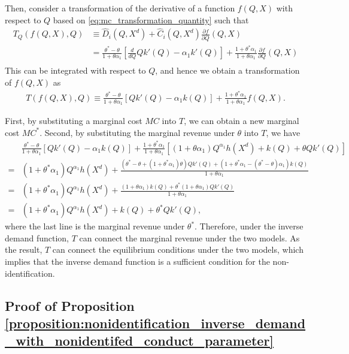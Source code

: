 \documentclass[11pt, a4paper]{article}
\theoremstyle{remark}
\begin{document}
Then, consider a transformation of the derivative of a function $f(Q, X)$ with respect to $Q$ based on \eqref{eq:mc_transformation_quantity} such that
\begin{align}
    T_Q\left(f(Q,X), Q\right) & \equiv \hat{D}_i(Q, X^{d}) + \hat{C}_i(Q, X^{d}) \frac{\partial f}{\partial Q}(Q, X)\\
    & = \frac{\theta^{*} - \theta}{1 + \theta\alpha_1} \left[\frac{d}{dQ}Qk'(Q)  -\alpha_1k'(Q) \right] + \frac{1 + \theta^{*}\alpha_1}{1 + \theta\alpha_1} \frac{\partial f}{\partial Q}(Q, X)\\
\end{align}
This can be integrated with respect to $Q$, and hence we obtain a transformation of $f(Q, X)$ as
\begin{align}
    T\left(f(Q,X), Q\right) \equiv \frac{\theta^{*} - \theta}{1 + \theta\alpha_1} \left[Qk'(Q) - \alpha_1k(Q) \right] + \frac{1 + \theta^{*}\alpha_1}{1 + \theta\alpha_1} f(Q, X).
\end{align}

First, by substituting a marginal cost $MC$ into $T$, we can obtain a new marginal cost $MC^{*}$.
Second, by substituting the marginal revenue under $\theta$ into $T$, we have
\begin{align}
    & \frac{\theta^{*} - \theta}{1 + \theta\alpha_1} \left[Qk'(Q) - \alpha_1k(Q) \right] + \frac{1 + \theta^{*}\alpha_1}{1 + \theta\alpha_1} \left[(1+\theta\alpha_1) Q^{\alpha_1}h(X^{d}) + k(Q) + \theta Qk'(Q)\right]\\
    = & (1 + \theta^{*}\alpha_1)Q^{\alpha_1}h(X^{d}) + \frac{(\theta^{*} - \theta + (1 + \theta^{*}\alpha_1)\theta)Qk'(Q) + (1 + \theta^{*}\alpha_1 - (\theta^{*} - \theta)\alpha_1) k(Q)}{1 + \theta\alpha_1}\\
    = & (1 + \theta^{*}\alpha_1)Q^{\alpha_1}h(X^{d}) + \frac{(1 + \theta\alpha_1) k(Q) + \theta^{*}(1 + \theta\alpha_1)Qk'(Q) }{1 + \theta\alpha_1}\\
    = & (1 + \theta^{*}\alpha_1)Q^{\alpha_1}h(X^{d}) +k(Q) + \theta^{*}Qk'(Q),
\end{align}
where the last line is the marginal revenue under $\theta^{*}$.
Therefore, under the inverse demand function, $T$ can connect the marginal revenue under the two models.
As the result, $T$ can connect the equilibrium conditions under the two models, which implies that the inverse demand function is a sufficient condition for the non-identification.




\subsection{Proof of Proposition \ref{proposition:nonidentification_inverse_demand_with_nonidentifed_conduct_parameter}}
\end{document}
